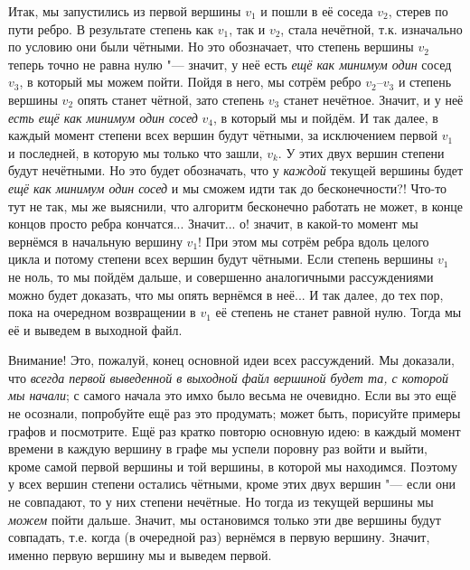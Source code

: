 Итак, мы запустились из первой вершины $v_1$ и пошли в её соседа $v_2$, стерев по пути ребро. В результате 
степень как $v_1$, так и $v_2$, стала нечётной, т.к. изначально по условию они были чётными. Но 
это обозначает, что степень вершины $v_2$ теперь точно не равна нулю "--- значит, у неё есть \textit{ещё 
как минимум один} сосед $v_3$, в который мы можем пойти. Пойдя в него, мы сотрём ребро $v_2$--$v_3$ 
и степень вершины $v_2$ опять станет чётной, зато степень $v_3$ станет нечётное. Значит, и у неё 
\textit{есть ещё как минимум один сосед} $v_4$, в который мы и пойдём. И так далее, в каждый момент 
степени всех вершин будут чётными, за исключением первой $v_1$ и последней, в которую мы только что 
зашли, $v_k$. У этих двух вершин степени будут нечётными. Но это будет обозначать, что у 
\textit{каждой} текущей вершины будет \textit{ещё как минимум один сосед} и мы сможем идти так до 
бесконечности?! Что-то тут не так, мы же выяснили, что алгоритм бесконечно работать не может, в 
конце концов просто ребра кончатся... Значит... о! значит, в какой-то момент мы вернёмся в 
начальную вершину $v_1$! При этом мы сотрём ребра вдоль целого цикла и потому степени всех вершин 
будут чётными. Если степень вершины $v_1$ не ноль, то мы пойдём дальше, и совершенно аналогичными 
рассуждениями можно будет доказать, что мы опять вернёмся в неё... И так далее, до тех пор, пока на 
очередном возвращении в $v_1$ её степень не станет равной нулю. Тогда мы её и выведем в выходной 
файл.

Внимание! Это, пожалуй, конец основной идеи всех рассуждений. Мы доказали, что \textit{всегда 
первой выведенной в выходной файл вершиной будет та, с которой мы начали}; с самого начала это имхо 
было весьма не очевидно. Если вы это ещё не осознали, попробуйте ещё раз это продумать; может быть, 
порисуйте примеры графов и посмотрите. Ещё раз кратко повторю основную идею: в каждый момент 
времени в каждую вершину в графе мы успели поровну раз войти и выйти, кроме самой первой вершины и 
той вершины, в которой мы находимся. Поэтому у всех вершин степени остались чётными, кроме этих 
двух вершин "--- если они не совпадают, то у них степени нечётные. Но тогда из текущей вершины мы 
\textit{можем} пойти дальше. Значит, мы остановимся только эти две вершины будут совпадать, т.е. 
когда (в очередной раз) вернёмся в первую вершину. Значит, именно первую вершину мы и выведем 
первой.

